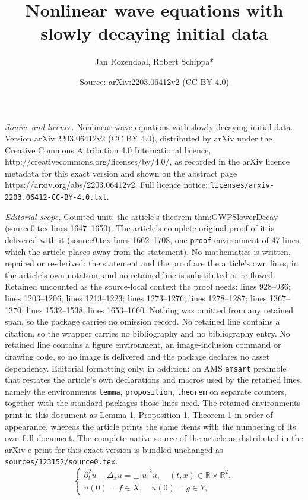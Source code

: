 \documentclass[10pt,a4paper]{amsart}
\title{Nonlinear wave equations with slowly decaying initial data}
\author{Jan Rozendaal, Robert Schippa*}
\date{Source: arXiv:2203.06412v2 (CC BY 4.0)}
\newcommand{\R}{\mathbb{R}}
\begin{document}
\maketitle

\noindent\emph{Source and licence.} Nonlinear wave equations with slowly decaying initial data. Version arXiv:2203.06412v2 (CC BY 4.0), distributed by arXiv under the Creative Commons Attribution 4.0 International licence, http://creativecommons.org/licenses/by/4.0/, as recorded in the arXiv licence metadata for this exact version and shown on the abstract page https://arxiv.org/abs/2203.06412v2. Full licence notice: \texttt{licenses/arxiv-2203.06412-CC-BY-4.0.txt}.\par\smallskip

\noindent\textit{Editorial scope.} Counted unit: the article's theorem thm:GWPSlowerDecay (source0.tex lines 1647--1650). The article's complete original proof of it is delivered with it (source0.tex lines 1662--1708, one \texttt{proof} environment of 47 lines, which the article places away from the statement). No mathematics is written, repaired or re-derived: the statement and the proof are the article's own lines, in the article's own notation, and no retained line is substituted or re-flowed.  Retained uncounted as the source-local context the proof needs: lines 928--936; lines 1203--1206; lines 1213--1223; lines 1273--1276; lines 1278--1287; lines 1367--1370; lines 1532--1538; lines 1653--1660.  Nothing was omitted from any retained span, so the package carries no omission record.  No retained line contains a citation, so the wrapper carries no bibliography and no bibliography entry.  No retained line contains a figure environment, an image-inclusion command or drawing code, so no image is delivered and the package declares no asset dependency.  Editorial formatting only, in addition: an AMS \texttt{amsart} preamble that restates the article's own declarations and macros used by the retained lines, namely the environments \texttt{lemma}, \texttt{proposition}, \texttt{theorem} on separate counters, together with the standard packages those lines need.  The retained environments print in this document as Lemma 1, Proposition 1, Theorem 1 in order of appearance, whereas the article prints the same items with the numbering of its own full document.  The complete native source of the article as distributed in the arXiv e-print for this exact version is bundled unchanged as \texttt{sources/123152/source0.tex}.
\begin{equation}
\label{eq:CubicNLW}
\begin{cases}
\partial_t^2 u - \Delta_{x} u = \pm |u|^2 u, \quad (t,x) \in \R \times \R^2, \\
u(0) = f \in X, \quad \dot{u}(0) = g \in Y,
\end{cases}
\end{equation}
\end{document}
